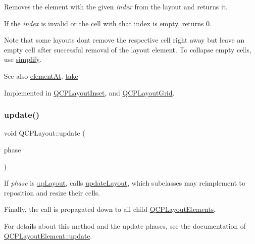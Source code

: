 Removes the element with the given {\itshape index} from the layout and returns it.

If the {\itshape index} is invalid or the cell with that index is empty, returns 0.

Note that some layouts don\textquotesingle{}t remove the respective cell right away but leave an empty cell after successful removal of the layout element. To collapse empty cells, use \mbox{\hyperlink{class_q_c_p_layout_a41e6ac049143866e8f8b4964efab01b2}{simplify}}.

\begin{DoxySeeAlso}{See also}
\mbox{\hyperlink{class_q_c_p_layout_afa73ca7d859f8a3ee5c73c9b353d2a56}{element\+At}}, \mbox{\hyperlink{class_q_c_p_layout_ada26cd17e56472b0b4d7fbbc96873e4c}{take}} 
\end{DoxySeeAlso}


Implemented in \mbox{\hyperlink{class_q_c_p_layout_inset_abf2e8233f5b7051220907e62ded490a2}{Q\+C\+P\+Layout\+Inset}}, and \mbox{\hyperlink{class_q_c_p_layout_grid_a17dd220234d1bbf8835abcc666384d45}{Q\+C\+P\+Layout\+Grid}}.

\mbox{\label{class_q_c_p_layout_a48ecc9c98ea90b547c3e27a931a8f7bd}} 
\subsubsection{\texorpdfstring{update()}{update()}}
{\footnotesize\ttfamily void Q\+C\+P\+Layout\+::update (\begin{DoxyParamCaption}\item[{\mbox{\hyperlink{class_q_c_p_layout_element_a0d83360e05735735aaf6d7983c56374d}{Update\+Phase}}}]{phase }\end{DoxyParamCaption})\hspace{0.3cm}{\ttfamily [virtual]}}

If {\itshape phase} is \mbox{\hyperlink{class_q_c_p_layout_element_a0d83360e05735735aaf6d7983c56374da5d1ccf5d79967c232c3c511796860045}{up\+Layout}}, calls \mbox{\hyperlink{class_q_c_p_layout_a165c77f6287ac92e8d03017ad913378b}{update\+Layout}}, which subclasses may reimplement to reposition and resize their cells.

Finally, the call is propagated down to all child \mbox{\hyperlink{class_q_c_p_layout_element}{Q\+C\+P\+Layout\+Elements}}.

For details about this method and the update phases, see the documentation of \mbox{\hyperlink{class_q_c_p_layout_element_a929c2ec62e0e0e1d8418eaa802e2af9b}{Q\+C\+P\+Layout\+Element\+::update}}. 


